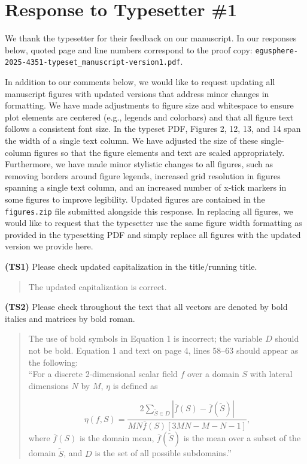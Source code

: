 \documentclass{article}
\begin{document}

\section*{Response to Typesetter \#1}
 
We thank the typesetter for their feedback on our manuscript. In our responses below, quoted page and line numbers correspond to the proof copy: \texttt{egusphere-2025-4351-typeset\_manuscript-version1.pdf}.

In addition to our comments below, we would like to request updating all manuscript figures with updated versions that address minor changes in formatting. We have made adjustments to figure size and whitespace to ensure plot elements are centered (e.g., legends and colorbars) and that all figure text follows a consistent font size. In the typeset PDF, Figures 2, 12, 13, and 14 span the width of a single text column.  We have adjusted the size of these single-column figures so that the figure elements and text are scaled appropriately. Furthermore, we have made minor stylistic changes to all figures, such as removing borders around figure legends, increased grid resolution in figures spanning a single text column, and an increased number of x-tick markers in some figures to improve legibility. Updated figures are contained in the \texttt{figures.zip} file submitted alongside this response. In replacing all figures, we would like to request that the typesetter use the same figure width formatting as provided in the typesetting PDF and simply replace all figures with the updated version we provide here.



\textbf{(TS1)} Please check updated capitalization in the title/running title.

\begin{quote}
    The updated capitalization is correct. 
\end{quote}

\textbf{(TS2)} Please check throughout the text that all vectors are denoted by bold italics and matrices by bold roman.

\begin{quote}
    The use of bold symbols in Equation 1 is incorrect; the variable $D$ should not be bold. Equation 1 and text on page 4, lines 58--63 should appear as the following:\\
    ``For a discrete 2-dimensional scalar field $f$ over a domain $S$ with lateral
    dimensions $N$ by $M$, $\eta$ is defined as

    \begin{equation}
    \eta(f, S) = \frac{2\sum_{\tilde{S}\in D}|\overline{f}(S) - \overline{f}(\tilde{S})|}{MN\overline{f}(S)\left[3MN-M-N-1\right]}, 
    \end{equation}
    where $\overline{f}(S)$ is the domain mean, $\overline{f}(\tilde{S})$ is the mean over a subset of the domain
    $\tilde{S}$, and $D$ is the set of all possible subdomains.'' 

\end{quote}
\end{document}

